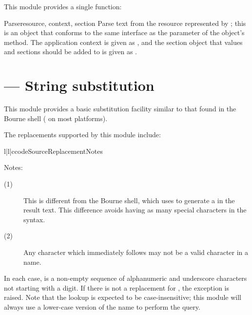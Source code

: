 \documentclass{howto}
\begin{document}
This module provides a single function:

\begin{funcdesc}{Parse}{resource, context, section}
  Parse text from the resource represented by ; this is
  an object that conforms to the same interface as the 
  parameter of the  object's  method.
  The application context is given as , and the section
  object that values and sections should be added to is given as
  .
\end{funcdesc}


\section{ --- String substitution}


This module provides a basic substitution facility similar to that
found in the Bourne shell ( on most \UNIX{} platforms).  

The replacements supported by this module include:

\begin{tableiii}{l|l|c}{code}{Source}{Replacement}{Notes}
\end{tableiii}

\noindent
Notes:
\begin{description}
  \item[(1)]  This is different from the Bourne shell, which uses
              \code{\textbackslash\$} to generate a \character{\$} in
              the result text.  This difference avoids having as many
              special characters in the syntax.

  \item[(2)]  Any character which immediately follows  may
              not be a valid character in a name.
\end{description}

In each case,  is a non-empty sequence of alphanumeric and
underscore characters not starting with a digit.  If there is not a
replacement for , the exception
 is raised.
Note that the lookup is expected to be case-insensitive; this module
will always use a lower-case version of the name to perform the query.
\end{document}
